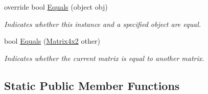 \begin{DoxyCompactItemize}
override bool \hyperlink{struct_open_t_k_1_1_matrix4x2_af861bbd948f766b082ed7a492b3499fa}{Equals} (object obj)
\begin{DoxyCompactList}\small\item\em Indicates whether this instance and a specified object are equal. \end{DoxyCompactList}\item 
bool \hyperlink{struct_open_t_k_1_1_matrix4x2_a136c3e896f9f638269a325fbe8ae83f0}{Equals} (\hyperlink{struct_open_t_k_1_1_matrix4x2}{Matrix4x2} other)
\begin{DoxyCompactList}\small\item\em Indicates whether the current matrix is equal to another matrix. \end{DoxyCompactList}\end{DoxyCompactItemize}
\subsection*{Static Public Member Functions}
